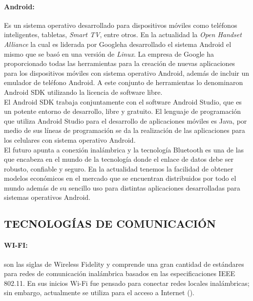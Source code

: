 \paragraph{Android:}
Es un sistema operativo desarrollado para dispositivos móviles como teléfonos inteligentes, tabletas, \textit{Smart TV}, entre otros. En la actualidad la \textit{Open Handset Alliance} la cual es liderada por Google\textregistered  ha desarrollado el sistema Android el mismo que se basó en una versión de \textit{Linux}. La empresa de Google ha proporcionado todas las herramientas para la creación de nuevas aplicaciones para los dispositivos móviles con sistema operativo Android, además de incluir un emulador de teléfono Android. A este conjunto de herramientas lo denominaron Android SDK utilizando la licencia de software libre. \\ 

El Android SDK trabaja conjuntamente con el software Android Studio, que es un potente entorno de desarrollo, libre y gratuito. El lenguaje de programación que utiliza Android Studio para el desarrollo de aplicaciones móviles es Java, por medio de sus líneas de programación se da la realización de las aplicaciones para los celulares con sistema operativo Android.\\

El futuro apunta a conexión inalámbrica y la tecnología Bluetooth es una de las que encabeza en el mundo de la tecnología donde el enlace de datos debe ser robusto, confiable y seguro. En la actualidad tenemos la facilidad de obtener modelos económicos en el mercado que se encuentran distribuidos por todo el mundo además de su sencillo uso para distintas aplicaciones desarrolladas para sistemas operativos Android.\\


\subsection{TECNOLOGÍAS DE COMUNICACIÓN}

\paragraph{WI-FI:}
son las siglas de Wireless Fidelity y comprende una gran cantidad de estándares para redes de comunicación inalámbrica basados en las especificaciones IEEE 802.11. En sus inicios Wi-Fi fue pensado para conectar redes locales inalámbricas; sin embargo, actualmente se utiliza para el acceso a Internet (\cite{MT-06}).\\ 

